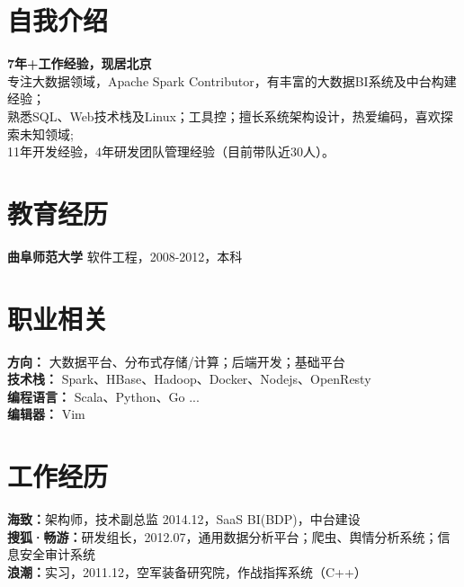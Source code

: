 \documentclass[UTF8,margin,line]{res}
\begin{document}

\begin{resume}

\section{\sc 自我介绍}
\textbf{7年+工作经验，现居北京} \\
专注大数据领域，Apache Spark Contributor，有丰富的大数据BI系统及中台构建经验； \\
熟悉SQL、Web技术栈及Linux；工具控；擅长系统架构设计，热爱编码，喜欢探索未知领域; \\
11年开发经验，4年研发团队管理经验（目前带队近30人）。

\section{\sc 教育经历}
\textbf{曲阜师范大学} 软件工程，2008-2012，本科

\section{\sc 职业相关}
\textbf{方向：} 大数据平台、分布式存储/计算；后端开发；基础平台 \\
\textbf{技术栈：} Spark、HBase、Hadoop、Docker、Nodejs、OpenResty \\
\textbf{编程语言：} Scala、Python、Go ... \\
\textbf{编辑器：} Vim

\section{\sc 工作经历}
\textbf{海致：}架构师，技术副总监 2014.12，SaaS BI(BDP)，中台建设 \\
\textbf{搜狐·畅游：}研发组长，2012.07，通用数据分析平台；爬虫、舆情分析系统；信息安全审计系统 \\
\textbf{浪潮：}实习，2011.12，空军装备研究院，作战指挥系统（C++）


\end{resume}
\end{document}
